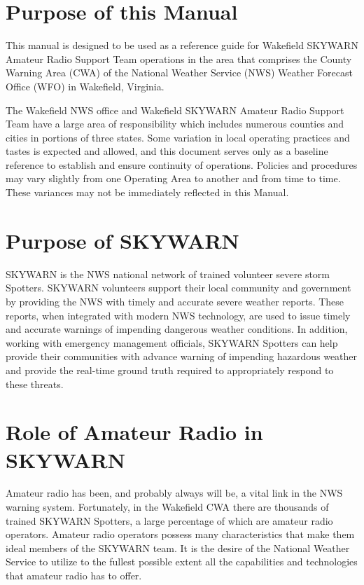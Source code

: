 \documentclass[pdflatex,letterpaper,twoside,12pt]{book}
\begin{document}

\section{Purpose of this Manual}

This manual is designed to be used as a reference guide for Wakefield SKYWARN Amateur Radio Support Team operations in the area that comprises the County Warning Area (CWA) of the National Weather Service (NWS) Weather Forecast Office (WFO) in Wakefield, Virginia.

The Wakefield NWS office and Wakefield SKYWARN Amateur Radio Support Team have a large area of responsibility which includes numerous counties and cities in portions of three states.  Some variation in local operating practices and tastes is expected and allowed, and this document serves only as a baseline reference to establish and ensure continuity of operations.  Policies and procedures may vary slightly from one Operating Area to another and from time to time.  These variances may not be immediately reflected in this Manual.


\section{Purpose of SKYWARN}

SKYWARN is the NWS national network of trained volunteer severe storm Spotters. SKYWARN volunteers support their local community and government by providing the NWS with timely and accurate severe weather reports.  These reports, when integrated with modern NWS technology, are used to issue timely and accurate warnings of impending dangerous weather conditions.  In addition, working with emergency management officials, SKYWARN Spotters can help provide their communities with advance warning of impending hazardous weather and provide the real-time ground truth required to appropriately respond to these threats.


\section{Role of Amateur Radio in SKYWARN}

Amateur radio has been, and probably always will be, a vital link in the NWS warning system.  Fortunately, in the Wakefield CWA there are thousands of trained SKYWARN Spotters, a large percentage of which are amateur radio operators.  Amateur radio operators possess many characteristics that make them ideal members of the SKYWARN team.  It is the desire of the National Weather Service to utilize to the fullest possible extent all the capabilities and technologies that amateur radio has to offer.
\end{document}
